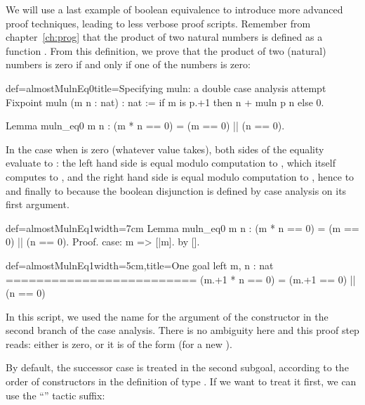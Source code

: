 We will use a last example of boolean equivalence to introduce more
advanced proof techniques, leading to less verbose proof
scripts. Remember from chapter~\ref{ch:prog} that the product of two
natural numbers is defined as a function
. From this definition, we prove that
the product of two (natural) numbers is zero if and only if one of the
numbers is zero:

\begin{coq}{def=almostMulnEq0}{title=Specifying muln: a double case analysis attempt}
Fixpoint muln (m n : nat) : nat :=
  if m is p.+1 then n + muln p n else 0.

Lemma muln_eq0 m n : (m * n == 0) = (m == 0) || (n == 0).
\end{coq}
In the case when  is zero (whatever value  takes), both
sides of the equality evaluate to : the left hand side is
equal modulo computation to , which itself computes to
, and the right hand side is equal modulo computation to
, hence to  and finally to
 because the boolean disjunction \C{(_ || _)} is defined by
case analysis on its first argument.

\begin{coq}{def=almostMulnEq1}{width=7cm}
Lemma muln_eq0 m n :
  (m * n == 0) = (m == 0) || (n == 0).
Proof.
case: m => [|m].
  by [].
\end{coq}
\begin{coqout}{def=almostMulnEq1}{width=5cm,title=One goal left}
m, n : nat
=========================
(m.+1 * n == 0) =
  (m.+1 == 0) || (n == 0)
\end{coqout}
In this script, we used the name  for the argument of the
constructor in the second branch of the case analysis. There is no
ambiguity here and this proof step reads: either  is zero, or it
is of the form  (for a new ).

By default, the successor case is treated in the second subgoal,
according to the order of constructors in the definition of type
. If we want to treat it first, we can use the ``'' tactic suffix:

